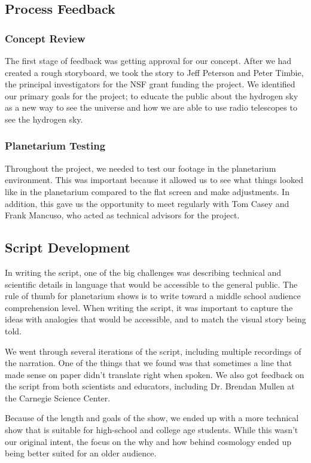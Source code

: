 \subsection{Process Feedback}

\subsubsection{Concept Review}
The first stage of feedback was getting approval for our concept. After we had created a rough storyboard, we took the story to Jeff Peterson and Peter Timbie, the principal investigators for the NSF grant funding the project. We identified our primary goals for the project; to educate the public about the hydrogen sky as a new way to see the universe and how we are able to use radio telescopes to see the hydrogen sky. 

\subsubsection{Planetarium Testing}
Throughout the project, we needed to test our footage in the planetarium environment. This was important because it allowed us to see what things looked like in the planetarium compared to the flat screen and make adjustments. In addition, this gave us the opportunity to meet regularly with Tom Casey and Frank Mancuso, who acted as technical advisors for the project. 

\subsection{Script Development}
In writing the script, one of the big challenges was describing technical and scientific details in language that would be accessible to the general public. The rule of thumb for planetarium shows is to write toward a middle school audience comprehension level. When writing the script, it was important to capture the ideas with analogies that would be accessible, and to match the visual story being told. 

We went through several iterations of the script, including multiple recordings of the narration. One of the things that we found was that sometimes a line that made sense on paper didn't translate right when spoken. We also got feedback on the script from both scientists and educators, including Dr. Brendan Mullen at the Carnegie Science Center. 

Because of the length and goals of the show, we ended up with a more technical show that is suitable for high-school and college age students. While this wasn't our original intent, the focus on the why and how behind \cm cosmology ended up being better suited for an older audience. 

